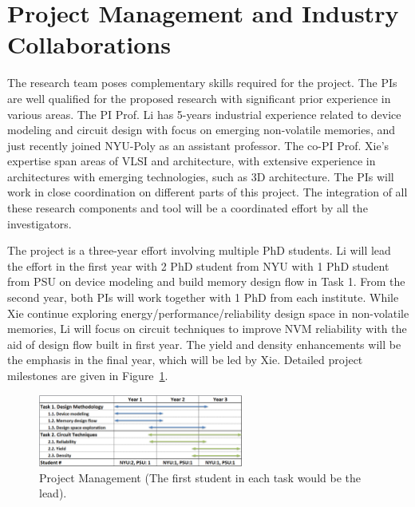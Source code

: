 
\section{Project Management and Industry Collaborations}
%

The research team poses complementary skills required for the project. The PIs are well qualified for the proposed research with significant prior experience in various areas. The PI Prof. Li has 5-years industrial experience related to device modeling and circuit design with focus on emerging non-volatile memories, and just recently joined NYU-Poly as an assistant professor. The co-PI Prof. Xie's expertise span areas of VLSI and architecture, with extensive experience in architectures with emerging technologies, such as 3D architecture. The PIs will work in close coordination on different parts of this project. The integration of all these research components and tool will be a coordinated effort by all the investigators.

The project is a three-year effort involving multiple PhD students. Li will lead the effort in the first year with 2 PhD student from NYU with 1 PhD student from PSU on device modeling and build memory design flow in Task 1. From the second year, both PIs will work together with 1 PhD from each institute. While Xie continue exploring energy/performance/reliability design space in non-volatile memories, Li will focus on circuit techniques to improve NVM reliability with the aid of design flow built in first year. The yield and density enhancements will be the emphasis in the final year, which will be led by Xie.
Detailed project milestones are given in Figure~\ref{fig:plan}.

\begin{figure}[htp]
\centering
\includegraphics[width=0.6\textwidth]{./figure/schedule.pdf}
\vspace{-10pt} \caption{Project Management (The first
student in each task would be the lead).}\label{fig:plan}
\end{figure}


